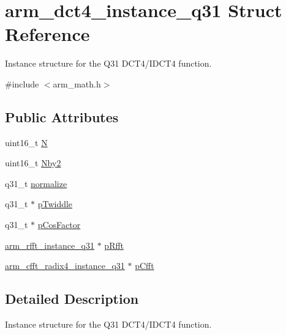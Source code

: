 \hypertarget{structarm__dct4__instance__q31}{\section{arm\-\_\-dct4\-\_\-instance\-\_\-q31 Struct Reference}
\label{structarm__dct4__instance__q31}
}


Instance structure for the Q31 D\-C\-T4/\-I\-D\-C\-T4 function.  




{\ttfamily \#include $<$arm\-\_\-math.\-h$>$}

\subsection*{Public Attributes}
\begin{DoxyCompactItemize}
\item 
uint16\-\_\-t \hyperlink{structarm__dct4__instance__q31_a46a9f136457350676e2bfd3768ff9d6d}{N}
\item 
uint16\-\_\-t \hyperlink{structarm__dct4__instance__q31_a32d3268ba4629908dba056599f0a904d}{Nby2}
\item 
q31\-\_\-t \hyperlink{structarm__dct4__instance__q31_ac80ff7b28fca36aeef74dea12e8312dd}{normalize}
\item 
q31\-\_\-t $\ast$ \hyperlink{structarm__dct4__instance__q31_a7db236e22673146bb1d2c962f0713f08}{p\-Twiddle}
\item 
q31\-\_\-t $\ast$ \hyperlink{structarm__dct4__instance__q31_af97204d1838925621fc82021a0c2d6c1}{p\-Cos\-Factor}
\item 
\hyperlink{structarm__rfft__instance__q31}{arm\-\_\-rfft\-\_\-instance\-\_\-q31} $\ast$ \hyperlink{structarm__dct4__instance__q31_af1487dab5e7963b85dc0fdc6bf492542}{p\-Rfft}
\item 
\hyperlink{structarm__cfft__radix4__instance__q31}{arm\-\_\-cfft\-\_\-radix4\-\_\-instance\-\_\-q31} $\ast$ \hyperlink{structarm__dct4__instance__q31_ac96579cfb28d08bb11dd2fe4c6303833}{p\-Cfft}
\end{DoxyCompactItemize}


\subsection{Detailed Description}
Instance structure for the Q31 D\-C\-T4/\-I\-D\-C\-T4 function. 

